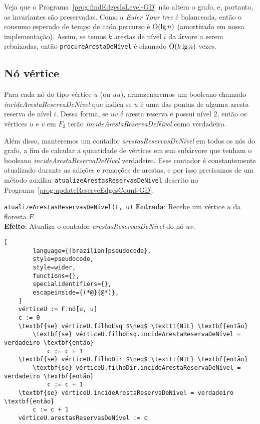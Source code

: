 Veja que o Programa~\ref{prog:findEdgesIsLevel-GD} não altera o grafo, e, portanto, as invariantes são preservadas. Como a \textit{Euler Tour tree} é balanceada, então o consumo esperado de tempo de cada percurso é $\mathrm{O}(\lg n)$ (amortizado em nossa implementação). Assim, se temos $k$ arestas de nível $i$ da árvore a serem rebaixadas, então \texttt{procureArestaDeNível} é chamado  $\mathrm{O}(k \lg n)$ vezes.

\subsection{Nó vértice}
\label{sec:node-vertex}

Para cada nó do tipo vértice $u$ (ou $uu$), armazenaremos um booleano chamado \textit{incideArestaReservaDeNível} que indica se $u$ é uma das pontas de alguma aresta reserva de nível $i$. Dessa forma, se $uv$ é aresta reserva e possui nível $2$, então os vértices $u$ e $v$ em $F_2$ terão \textit{incideArestaReservaDeNível} como verdadeiro. 

Além disso, manteremos um contador \textit{arestasReservasDeNível} em todos os nós do grafo, a fim de calcular a quantidade de vértices em sua subárvore que tenham o booleano \textit{incideArestaReservaDeNível} verdadeiro. Esse contador é constantemente atualizado durante as adições e remoções de arestas, e por isso precisamos de um método auxiliar \texttt{atualizeArestasReservasDeNível} descrito no Programa~\ref{prog:updateReserveEdgesCount-GD}.

\begin{programruledcaption}{\texttt{atualizeArestasReservasDeNível(F, u)} \label{prog:updateReserveEdgesCount-GD}}
    \noindent\textbf{Entrada}: Recebe um vértice $u$ da floresta $F$.
    \\
    \noindent\textbf{Efeito}: Atualiza o contador \textit{arestasReservasDeNível} do nó $uv$.
    \vspace{-0.5\baselineskip}
    \begin{lstlisting}[
        language={[brazilian]pseudocode},
        style=pseudocode,
        style=wider,
        functions={},
        specialidentifiers={},
        escapeinside={(*@}{@*)},
    ]
    vérticeU := F.nó[u, u]
    c := 0
    \textbf{se} vérticeU.filhoEsq $\neq$ \texttt{NIL} \textbf{então}
        \textbf{se} vérticeU.filhoEsq.incideArestaReservaDeNível = verdadeiro \textbf{então}
            c := c + 1
    \textbf{se} vérticeU.filhoDir $\neq$ \texttt{NIL} \textbf{então}
        \textbf{se} vérticeU.filhoDir.incideArestaReservaDeNível = verdadeiro \textbf{então}
            c := c + 1
    \textbf{se} vérticeU.incideArestaReservaDeNível = verdadeiro \textbf{então}
        c := c + 1
    vérticeU.arestasReservasDeNível := c
    \end{lstlisting}
    \vspace{-0.5\baselineskip}
\end{programruledcaption}

